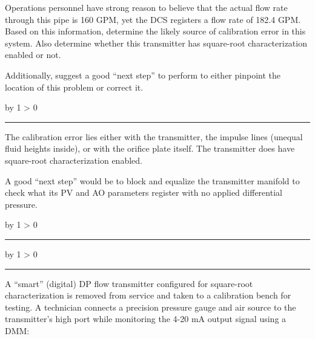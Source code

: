 \documentclass[12pt,a4paper]{article}
\def\oppgave{
            \advance\questnum by 1
            \ifnum \questnum > 0
                 \hrule
                 \vskip 3pt
                 \leftline{Oppgave \the\questnum}
                 \vskip 3pt \fi}
\def\svar{
           \advance\answnum by 1
           \ifnum \answnum > 0
                \hrule
                \vskip 3pt
                \leftline{Svar \the\answnum}
                \vskip 3pt \fi}
\def\notes{
           \advance\explnum by 1
           \ifnum \explnum > 0
                \hrule
                \vskip 3pt
                \leftline{Notes \the\explnum}
                \vskip 3pt \fi}
\begin{document}
Operations personnel have strong reason to believe that the actual flow rate through this pipe is 160 GPM, yet the DCS registers a flow rate of 182.4 GPM.  Based on this information, determine the likely source of calibration error in this system.  Also determine whether this transmitter has square-root characterization enabled or not.

\vskip 10pt

Additionally, suggest a good ``next step'' to perform to either pinpoint the location of this problem or correct it.

\vskip 10pt \filbreak 





\svar{} 

The calibration error lies either with the transmitter, the impulse lines (unequal fluid heights inside), or with the orifice plate itself.  The transmitter does have square-root characterization enabled.

\vskip 10pt

A good ``next step'' would be to block and equalize the transmitter manifold to check what its PV and AO parameters register with no applied differential pressure.

\vskip 10pt \filbreak 





\notes{} 



\vfil \eject 


\oppgave{} 

A ``smart'' (digital) DP flow transmitter configured for square-root characterization is removed from service and taken to a calibration bench for testing.  A technician connects a precision pressure gauge and air source to the transmitter's high port while monitoring the 4-20 mA output signal using a DMM:
\end{document}
